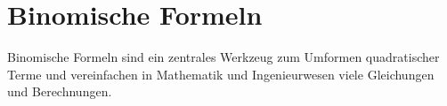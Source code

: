\section{Binomische Formeln}
\label{sec:fundamentals_binomial_formulas}

Binomische Formeln sind ein zentrales Werkzeug zum Umformen quadratischer
Terme und vereinfachen in Mathematik und Ingenieurwesen viele Gleichungen und
Berechnungen.



